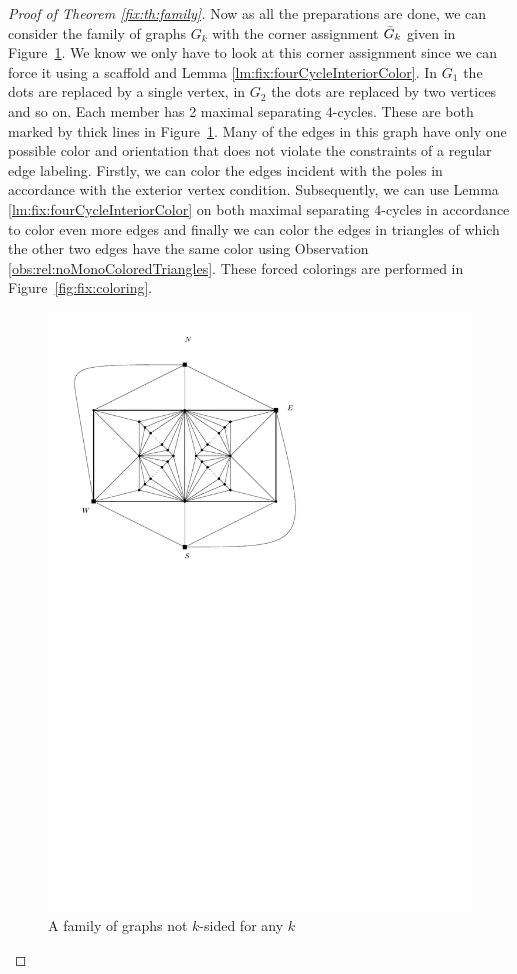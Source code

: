 \begin{proof}[Proof of Theorem \ref{fix:th:family}]
  Now as all the preparations are done, we can consider the family of graphs $G_k$ with the corner assignment $\bar{G}_k$ given in Figure~\ref{fig:fix:manymany0}.
  We know we only have to look at this corner assignment since we can force it using a scaffold and Lemma \ref{lm:fix:fourCycleInteriorColor}.
  In $G_1$ the dots are replaced by a single vertex, in $G_2$ the dots are replaced by two vertices and so on.
  Each member has 2 maximal separating $4$-cycles.
  These are both marked by thick lines in Figure~\ref{fig:fix:manymany0}.
  Many of the edges in this graph have only one possible color and orientation that does not violate the constraints of a regular edge labeling.
  Firstly, we can color the edges incident with the poles in accordance with the exterior vertex condition.
  Subsequently, we can use Lemma \ref{lm:fix:fourCycleInteriorColor} on both maximal separating $4$-cycles in accordance to color even more edges and finally we can color the edges in triangles of which the other two edges have  the same color using Observation \ref{obs:rel:noMonoColoredTriangles}.
  These forced colorings are performed in Figure~\ref{fig:fix:coloring}.

  \begin{figure}[t]
    \centering
    \includegraphics[scale=1]{fixExtension/img/manymanybase}
    \caption{A family of graphs not $k$-sided for any $k$}
    \label{fig:fix:manymany0}
  \end{figure}


\end{proof}
